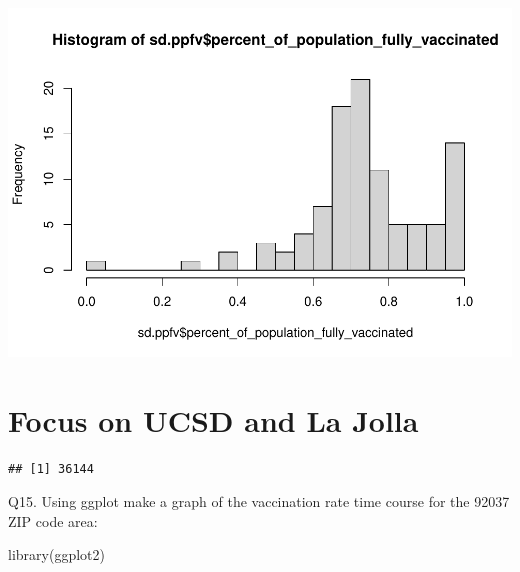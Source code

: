 \documentclass[
]{article}
\newenvironment{Shaded}{\begin{snugshade}}{\end{snugshade}}
\newcommand{\CommentTok}[1]{\textcolor[rgb]{0.56,0.35,0.01}{\textit{#1}}}
\newcommand{\DecValTok}[1]{\textcolor[rgb]{0.00,0.00,0.81}{#1}}
\newcommand{\FunctionTok}[1]{\textcolor[rgb]{0.00,0.00,0.00}{#1}}
\newcommand{\NormalTok}[1]{#1}
\newcommand{\OtherTok}[1]{\textcolor[rgb]{0.56,0.35,0.01}{#1}}
\newcommand{\SpecialCharTok}[1]{\textcolor[rgb]{0.00,0.00,0.00}{#1}}
\newcommand{\StringTok}[1]{\textcolor[rgb]{0.31,0.60,0.02}{#1}}
\begin{document}
\includegraphics{Lab-17-MiniAssn_files/figure-latex/unnamed-chunk-22-1.pdf}

\hypertarget{focus-on-ucsd-and-la-jolla}{%
\section{Focus on UCSD and La Jolla}\label{focus-on-ucsd-and-la-jolla}}

\begin{Shaded}
\end{Shaded}

\begin{verbatim}
## [1] 36144
\end{verbatim}

Q15. Using ggplot make a graph of the vaccination rate time course for
the 92037 ZIP code area:

\begin{Shaded}
\begin{Highlighting}[]
\FunctionTok{library}\NormalTok{(ggplot2)}
\end{Highlighting}
\end{Shaded}
\end{document}
